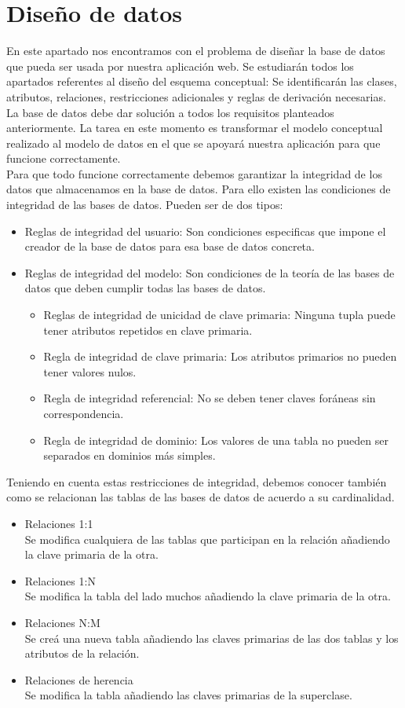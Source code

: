 \section{Diseño de datos}
En este apartado nos encontramos con el problema de diseñar la base de datos que pueda ser usada por nuestra aplicación web. Se estudiarán todos los apartados referentes al diseño del esquema conceptual: Se identificarán las clases, atributos, relaciones, restricciones adicionales y reglas de derivación necesarias.\\
La base de datos debe dar solución a todos los requisitos planteados anteriormente. La tarea en este momento es transformar el modelo conceptual realizado al modelo de datos en el que se apoyará nuestra aplicación para que funcione correctamente.\\
Para que todo funcione correctamente debemos garantizar la integridad de los datos que almacenamos en la base de datos. Para ello existen las condiciones de integridad de las bases de datos. Pueden ser de dos tipos:
\begin{itemize}

\item Reglas de integridad del usuario:
Son condiciones especificas que impone el creador de la base de datos para esa base de datos concreta.
\item Reglas de integridad del modelo:
Son condiciones de la teoría de las bases de datos que deben cumplir todas las bases de datos.
\begin{itemize}
\item Reglas de integridad de unicidad de clave primaria:
Ninguna tupla puede tener atributos repetidos en clave primaria.
\item Regla de integridad de clave primaria:
Los atributos primarios no pueden tener valores nulos.
\item Regla de integridad referencial:
No se deben tener claves foráneas sin correspondencia.
\item Regla de integridad de dominio:
Los valores de una tabla no pueden ser separados en dominios más simples.
\end{itemize}
\end{itemize}

Teniendo en cuenta estas restricciones de integridad, debemos conocer también como se relacionan las tablas de las bases de datos de acuerdo a su cardinalidad. 
\begin{itemize}
\item Relaciones 1:1\\
Se modifica cualquiera de las tablas que participan en la relación añadiendo la clave primaria de la otra.
\item Relaciones 1:N\\
Se modifica la tabla del lado muchos añadiendo la clave primaria de la otra.
\item Relaciones N:M\\
Se creá una nueva tabla añadiendo las claves primarias de las dos tablas y los atributos de la relación.
\item Relaciones de herencia\\
Se modifica la tabla añadiendo las claves primarias de la superclase.
\end{itemize}

